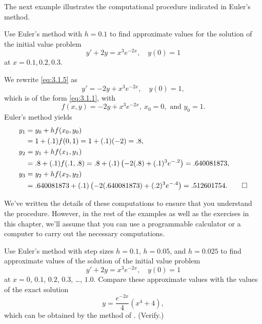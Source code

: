 The next example illustrates the computational procedure
indicated in Euler's method.

\begin{example}\label{example:3.1.1}
Use Euler's method with $h=0.1$ to find approximate values for the
solution of the initial value problem
\begin{equation}\label{eq:3.1.5}
y'+2y=x^3e^{-2x},\quad y(0)=1
\end{equation}
at $x=0.1,0.2,0.3$.
\end{example}

\begin{solution}
We rewrite \eqref{eq:3.1.5}  as
\[
y'=-2y+x^3e^{-2x},\quad y(0)=1,
\]
which is of the form \eqref{eq:3.1.1}, with
\[
f(x,y)=-2y+x^3e^{-2x},\ x_0=0,\text{ and }y_0=1.
\]
Euler's method yields
\begin{align*}
y_1 & = y_0+hf(x_0,y_0)\\
 & = 1+(.1)f(0,1)=1+(.1)(-2)=.8,\\
y_2 & = y_1+hf(x_1,y_1)\\
 & = .8+(.1)f(.1,.8)=.8+(.1)\left(-2(.8)+(.1)^3e^{-.2}\right)=
.640081873,\\
y_3 & = y_2+hf(x_2,y_2)\\
 & = .640081873+(.1)\left(-2(.640081873)+(.2)^3e^{-.4}\right)=
.512601754.\qedhere
\end{align*}
\end{solution}

We've written the details of these computations to ensure that you
understand the procedure. However,  in the rest of the examples as
well as
 the exercises  in this chapter, we'll assume that you can use a
programmable calculator or a computer
to carry out the necessary computations.

\medskip
{}


\begin{example}\label{example:3.1.2}
Use Euler's method with step sizes $h=0.1$, $h=0.05$, and $h=0.025$ to
find approximate values of the solution of the initial value problem
\[
y'+2y=x^3e^{-2x},\quad y(0)=1
\]
at $x=0$, $0.1$, $0.2$, $0.3$, \dots, $1.0$. Compare these approximate
values
with the values of the exact solution
\begin{equation} \label{eq:3.1.6}
y=\frac{e^{-2x}}{4}(x^4+4),
\end{equation}
which can be obtained by the method of .
(Verify.)
\end{example}

